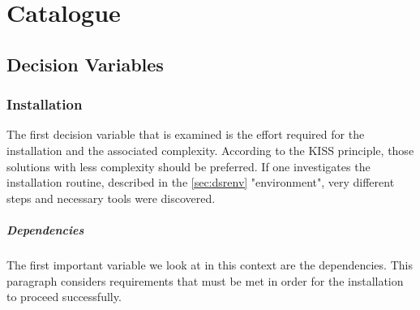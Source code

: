 \documentclass[MIC,Master,english]{twbook}%
\begin{document}
\pagebreak
\chapter{Catalogue}
\label{chap:catalogue}

\section{Decision Variables}
\label{sec:variables}
\subsection{Installation}
The first decision variable that is examined is the effort required for the installation and the associated complexity. According to the KISS principle\cite{kiss}, those solutions with less complexity should be preferred. If one investigates the installation routine, described in the \autoref{sec:dsrenv} "environment", very different steps and necessary tools were discovered. 
\paragraph{Dependencies} The first important variable we look at in this context are the dependencies. This paragraph considers requirements that must be met in order for the installation to proceed successfully.
\end{document}
